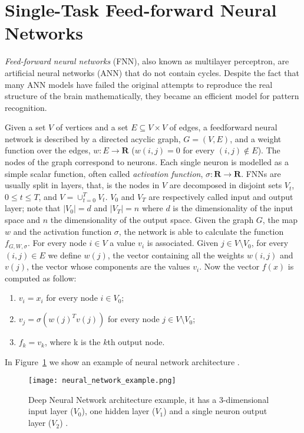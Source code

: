 \section{Single-Task Feed-forward Neural Networks} \label{sec:singletaskNN}
\emph{Feed-forward neural networks} (FNN), also known as multilayer perceptron, are artificial neural networks (ANN) that do not contain cycles. Despite the fact that many ANN models have failed the original attempts to reproduce the real structure of the brain mathematically, they became an efficient model for pattern recognition. 

Given a set $V$ of vertices and a set  $E\subseteq V\times V$ of edges, a feedforward neural network is described by a directed acyclic graph, $G =
(V,E)$, and a weight function over the edges, $w : E \to \mathbf R$ ($w(i, j) = 0$
for every $(i, j) \notin E$). The nodes of the graph correspond to neurons. Each
single neuron is modelled as a simple scalar function, often called \emph{activation function},  $ \sigma : \mathbf R \to
\mathbf R$. FNNs are usually
split in layers, that, is the nodes in $V$ are decomposed in disjoint sets $V_t$, $0\leq t\leq T$,
and $V = \cup_{t = 0}^T V_t$. $V_0$ and
$V_T$ are respectively called input and output layer; note that $|V_0| = d$ and
$|V_T| = n$ where $d$ is the dimensionality of the input space and $n$ the
dimensionality of the output space. Given the graph $G$, the map $w$ and the
activation function $\sigma$, the network is able to calculate the function
$f_{G,W,\sigma}$. For every node $i \in V$ a value $v_i$ is associated. Given $j
\in V \setminus V_0$, for every $(i, j) \in E$ we define $w(j)$, the vector containing all
the weights $w(i, j)$ and $v(j)$, the vector whose components are the values $v_i$. Now the
vector $f(x)$ is computed as follow:
\begin{enumerate}
    \item $v_i = x_i$ for every node $i \in V_0$;
    \item $v_j = \sigma(w(j)^T v(j))$ for every node $j \in V \setminus V_0$;
    \item $f_k = v_k$, where k is the $k$th output node.
\end{enumerate}
In Figure~\ref{fig:neural_network_example} we show an example of neural network architecture \cite{ShwartzUnderstadningML, BishopML}.
\begin{figure}[ht]
\texttt{[image: neural\_network\_example.png]}
\caption{Deep Neural Network architecture example, it has a 3-dimensional input layer
($V_0$), one hidden layer ($V_1$) and a single neuron output layer ($V_2$)
\cite{ShwartzUnderstadningML}.} 
\label{fig:neural_network_example}
\end{figure}

